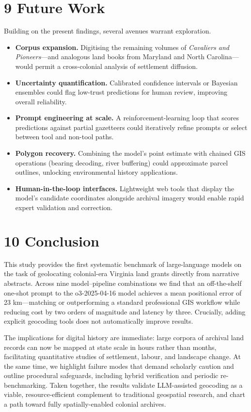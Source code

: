 \documentclass[
  11pt,
]{article}
\providecommand{\tightlist}{%
  \setlength{\itemsep}{0pt}\setlength{\parskip}{0pt}}
\begin{document}
\section{9 Future Work}\label{future-work}

Building on the present findings, several avenues warrant exploration.

\begin{itemize}
\tightlist
\item
  \textbf{Corpus expansion.} Digitising the remaining volumes of
  \emph{Cavaliers and Pioneers}---and analogous land books from Maryland
  and North Carolina---would permit a cross-colonial analysis of
  settlement diffusion.
\item
  \textbf{Uncertainty quantification.} Calibrated confidence intervals
  or Bayesian ensembles could flag low-trust predictions for human
  review, improving overall reliability.
\item
  \textbf{Prompt engineering at scale.} A reinforcement-learning loop
  that scores predictions against partial gazetteers could iteratively
  refine prompts or select between tool and non-tool paths.
\item
  \textbf{Polygon recovery.} Combining the model's point estimate with
  chained GIS operations (bearing decoding, river buffering) could
  approximate parcel outlines, unlocking environmental history
  applications.
\item
  \textbf{Human-in-the-loop interfaces.} Lightweight web tools that
  display the model's candidate coordinates alongside archival imagery
  would enable rapid expert validation and correction.
\end{itemize}

\section{10 Conclusion}\label{conclusion}

This study provides the first systematic benchmark of large-language
models on the task of geolocating colonial-era Virginia land grants
directly from narrative abstracts. Across nine model--pipeline
combinations we find that an off-the-shelf one-shot prompt to the
o3-2025-04-16 model achieves a mean positional error of 23 km---matching
or outperforming a standard professional GIS workflow while reducing
cost by two orders of magnitude and latency by three. Crucially, adding
explicit geocoding tools does not automatically improve results.

The implications for digital history are immediate: large corpora of
archival land records can now be mapped at state scale in hours rather
than months, facilitating quantitative studies of settlement, labour,
and landscape change. At the same time, we highlight failure modes that
demand scholarly caution and outline procedural safeguards, including
hybrid verification and periodic re-benchmarking. Taken together, the
results validate LLM-assisted geocoding as a viable, resource-efficient
complement to traditional geospatial research, and chart a path toward
fully spatially-enabled colonial archives.
\end{document}
